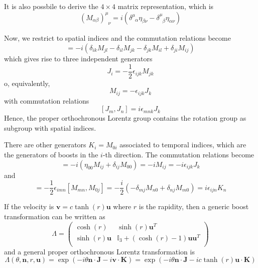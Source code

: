     It is also possbile to derive the $4 \times 4$ matrix representation, which is 
    \begin{equation*}
        (M_{\alpha\beta})^\mu_{\phantom \mu \nu} = i (\delta^\mu_{\phantom \mu \alpha} \eta_{\beta \nu} - \delta^\mu_{\phantom \mu \beta} \eta_{\alpha \nu})
    \end{equation*}

    Now, we restrict to spatial indices and the commutation relations become
    \begin{equation*}
        [M_{ij}, M_{kl}] = - i (\delta_{ik} M_{jl} - \delta_{il} M_{jk} - \delta_{jk} M_{il} + \delta_{ji} M_{ij})
    \end{equation*}
    which gives rise to three independent generators 
    \begin{equation*}
        J_i = - \frac{1}{2} \epsilon_{ijk} M_{jk}
    \end{equation*}
    o, equivalently,
    \begin{equation*}
        M_{ij} = - \epsilon_{ijk} J_k
    \end{equation*}
    with commutation relations 
    \begin{equation}\label{commjj}
        [J_m, J_n] = i \epsilon_{mnk} J_k
    \end{equation}
    Hence, the proper orthochronous Lorentz group contains the rotation group as subgroup with spatial indices.

    There are other generators $K_i = M_{0i}$ associated to temporal indices, which are the generators of boosts in the $i$-th direction. The commutation relations become 
    \begin{equation*}
        [K_i, K_j] = -i(\eta_{00} M_{ij} + \delta_{ij} M_{00}) = - iM_{ij} = - i \epsilon_{ijk} J_k
    \end{equation*}
    and 
    \begin{equation*}
        [J_i, K_j] = - \frac{1}{2} \epsilon_{imn} [M_{mn}, M_{0j}] = - \frac{i}{2} (- \delta_{mj} M_{n0} + \delta_{nj} M_{m0}) = i \epsilon_{ijn} K_n
    \end{equation*}

    If the velocity is $\mathbf v = c \tanh(r) \mathbf u$ where $r$ is the rapidity, then a generic boost transformation can be written as 
    \begin{equation*}
        \Lambda = \begin{pmatrix}
            \cosh(r) & \sinh(r) \mathbf u^T \\
            \sinh(r) \mathbf u & \mathbb I_3 + (\cosh(r)-1) \mathbf u \mathbf u^T \\
        \end{pmatrix}
    \end{equation*}
    and a general proper orthochronous Lorentz transformation is 
    \begin{equation*}
        \Lambda (\theta, \mathbf n, r, \mathbf u) = \exp(-i \theta \mathbf n \cdot \mathbf J - i \mathbf v \cdot \mathbf K) = \exp(- i \theta \mathbf n \cdot \mathbf J - i c \tanh(r) \mathbf u \cdot \mathbf K)
    \end{equation*}

